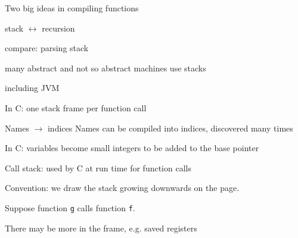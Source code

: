 \documentclass[landscape]{beamer}
\begin{document}
\begin{frame}{Two big ideas in compiling functions}

\begin{block}{stack $\leftrightarrow$ recursion}

compare: parsing stack

many abstract and not so abstract machines use stacks

including JVM

In C: one stack frame per function call
\end{block}

\begin{block}{Names $\to$ indices}
Names can be compiled into indices, discovered many times

%

In C: variables become small integers to be added to the base pointer

\end{block}

\end{frame}


\begin{frame}[fragile]{Call stack: used by C at run time for function calls}


Convention: we draw the stack growing \alert{downwards} on the page. 

Suppose function \texttt g calls function \texttt f.


There may be more in the frame, e.g. saved registers  
\end{frame}   
\end{document}
